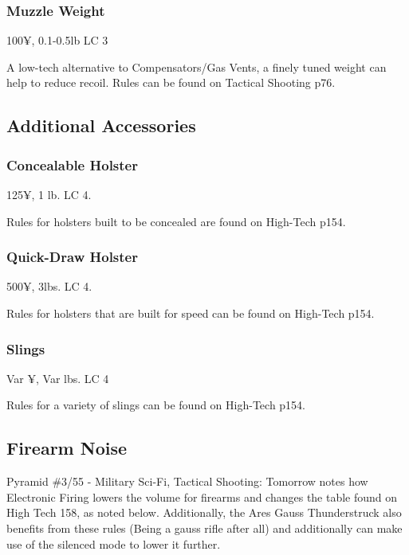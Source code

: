 \subsubsection{Muzzle Weight}
100¥, 0.1-0.5lb LC 3

A low-tech alternative to Compensators/Gas Vents, a finely tuned weight can help to reduce recoil. Rules can be found on Tactical Shooting p76.

\subsection{Additional Accessories}

\subsubsection{Concealable Holster}
125¥, 1 lb. LC 4.

Rules for holsters built to be concealed are found on High-Tech p154.

\subsubsection{Quick-Draw Holster}
500¥, 3lbs. LC 4.

Rules for holsters that are built for speed can be found on High-Tech p154.

\subsubsection{Slings}
Var ¥, Var lbs. LC 4

Rules for a variety of slings can be found on High-Tech p154.

\subsection{Firearm Noise}

Pyramid \#3/55 - Military Sci-Fi, Tactical Shooting: Tomorrow notes how Electronic Firing lowers the volume for firearms and changes the table found on High Tech 158, as noted below. Additionally, the Ares Gauss Thunderstruck also benefits from these rules (Being a gauss rifle after all) and additionally can make use of the silenced mode to lower it further.

